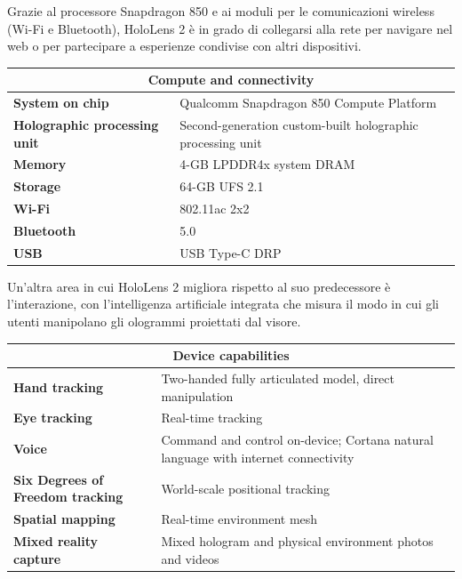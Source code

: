 Grazie al processore Snapdragon 850 e ai moduli per le comunicazioni wireless (Wi-Fi e Bluetooth), HoloLens 2 è in grado di collegarsi alla rete per navigare nel web o per partecipare a esperienze condivise con altri dispositivi.

\begin{center}
    \begin{tabular}{ p{6cm} p{7cm} }
        \hline
        \multicolumn{2}{c}{\textbf{Compute and connectivity}} \\
        \hline
        \textbf{System on chip} & Qualcomm Snapdragon 850 Compute Platform\\
        \hline
        \textbf{Holographic processing unit} & Second-generation custom-built holographic processing unit\\
        \hline
        \textbf{Memory} & 4-GB LPDDR4x system DRAM\\
        \hline
        \textbf{Storage} & 64-GB UFS 2.1\\
        \hline
        \textbf{Wi-Fi} & 802.11ac 2x2\\
        \hline
        \textbf{Bluetooth} & 5.0\\
        \hline
        \textbf{USB} & USB Type-C DRP\\
        \hline
    \end{tabular}
\end{center}

Un'altra area in cui HoloLens 2 migliora rispetto al suo predecessore è l'interazione, con l'intelligenza artificiale integrata che misura il modo in cui gli utenti manipolano gli ologrammi proiettati dal visore.

\begin{center}
    \begin{tabular}{ p{6cm} p{7cm} }
        \hline
        \multicolumn{2}{c}{\textbf{Device capabilities}} \\
        \hline
        \textbf{Hand tracking} & Two-handed fully articulated model, direct manipulation\\
        \hline
        \textbf{Eye tracking} & Real-time tracking\\
        \hline
        \textbf{Voice} & Command and control on-device; Cortana natural language with internet connectivity\\
        \hline
        \textbf{Six Degrees of Freedom tracking} & World-scale positional tracking\\
        \hline
        \textbf{Spatial mapping} & Real-time environment mesh\\
        \hline
        \textbf{Mixed reality capture} & Mixed hologram and physical environment photos and videos\\
        \hline
    \end{tabular}
\end{center}


